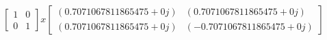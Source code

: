 \documentclass[12pt,landscape]{standalone}%
\begin{document}
%
\normalsize%
\[%
\begin{bmatrix}%
1&0\\%
0&1%
\end{bmatrix} x \begin{bmatrix}%
(0.7071067811865475+0j)&(0.7071067811865475+0j)\\%
(0.7071067811865475+0j)&(-0.7071067811865475+0j)%
\end{bmatrix}%
\]%
\end{document}
